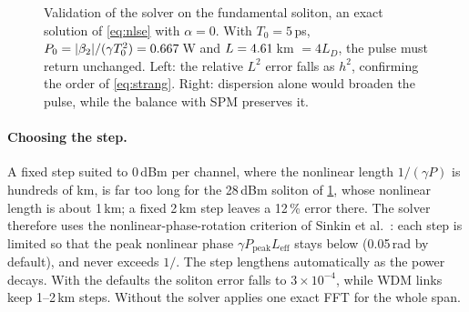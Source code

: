 \begin{figure}[htbp]
\centering
{}
\caption{Validation of the solver on the fundamental soliton, an exact solution of \cref{eq:nlse}
with $\alpha=0$. With $T_0=5$\,ps, $P_0=|\beta_2|/(\gamma T_0^2)=0.667$\,W and
$L=4.61$\,km $=4L_D$, the pulse must return unchanged. Left: the relative $L^2$ error falls as
$h^2$, confirming the order of \cref{eq:strang}. Right: dispersion alone would broaden the pulse,
while the balance with SPM preserves it.}
\label{fig:soliton}
\end{figure}

\paragraph{Choosing the step.} A fixed step suited to 0\,dBm per channel, where the nonlinear
length $1/(\gamma P)$ is hundreds of km, is far too long for the 28\,dBm soliton of
\cref{fig:soliton}, whose nonlinear length is about 1\,km; a fixed 2\,km step leaves a 12\,\% error
there. The solver therefore uses the nonlinear-phase-rotation criterion of Sinkin et
al.~\cite{sinkin2003}: each step is limited so that the peak nonlinear phase
$\gamma P_{\mathrm{peak}}L_{\mathrm{eff}}$ stays below  (0.05\,rad by default), and never
exceeds $1/$. The step lengthens automatically as the power decays. With the
defaults the soliton error falls to $3\times10^{-4}$, while WDM links keep 1--2\,km steps. Without
 the solver applies one exact FFT for the whole span.

